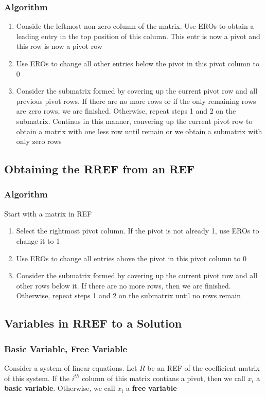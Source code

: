 \documentclass[12pt, letterpaper]{article}
\begin{document}
\subsubsection*{Algorithm}
\begin{enumerate}
    \item Conside the leftmost non-zero column of the matrix. Use EROs to obtain a leading entry in the top position of this column. This entr is now a pivot and this row is now a pivot row
    \item Use EROs to change all other entries below the pivot in this pivot column to 0
    \item Consider the submatrix formed by covering up the current pivot row and all previous pivot rows. If there are no more rows or if the only remaining rows are zero rows, we are finished. Otherwise, repeat steps 1 and 2 on the submatrix. Continus in this manner, convering up the current pivot row to obtain a matrix with one less row until remain or we obtain a submatrix with only zero rows 
\end{enumerate}
\subsection{Obtaining the RREF from an REF}
\subsubsection*{Algorithm}
Start with a matrix in REF
\begin{enumerate}
    \item Select the rightmost pivot column. If the pivot is not already 1, use EROs to change it to 1
    \item Use EROs to change all entries above the pivot in this pivot column to 0
    \item Consider the submatrix formed by covering up the current pivot row and all other rows below it. If there are no more rows, then we are finished. Otherwise, repeat steps 1 and 2 on the submatrix until no rows remain
\end{enumerate}
\subsection{Variables in RREF to a Solution}
\subsubsection{Basic Variable, Free Variable}
Consider a system of linear equations. Let $R$ be an REF of the coefficient matrix of this system. 
If the $i^{th}$ column of this matrix contians a pivot, then we call $x_i$ a \textbf{basic variable}.
Otherwise, we call $x_i$ a \textbf{free variable}
\end{document}
